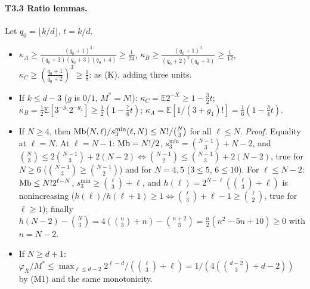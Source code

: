\documentclass[11pt]{article}
\newcommand{\E}{\mathbb{E}}
\theoremstyle{definition}
\theoremstyle{remark}
\begin{document}
\paragraph{T3.3 Ratio lemmas.} Let $q_0=\lfloor k/d\rfloor$, $t=k/d$.
\begin{itemize}
\item[(K3)] $\kappa_A\ge\frac{(q_0+1)^3}{(q_0+2)(q_0+3)(q_0+4)}\ge\frac1{24}$, $\kappa_B\ge\frac{(q_0+1)^3}{(q_0+2)^2(q_0+3)}\ge\frac1{12}$,
$\kappa_C\ge(\frac{q_0+1}{q_0+2})^3\ge\frac18$: as (K), adding three units.
\item[(K3-0)] If $k\le d-3$ ($g$ is $0/1$, $M^\ast=N!$): $\kappa_C=\E2^{-X}\ge1-\frac32t$; $\kappa_B=\frac12\E[3^{-g_1}2^{-g_2}]\ge\frac12(1-\frac76t)$;
$\kappa_A=\E[1/(3+g_1)!]=\frac16(1-\frac34t)$.
\item[(J3)] If $N\ge4$, then $\mathrm{Mb}(N,\ell)/s_3^{\min}(\ell,N)\le N!/\binom N3$ for all $\ell\le N$. \emph{Proof.} Equality at $\ell=N$. At $\ell=N-1$:
$\mathrm{Mb}=N!/2$, $s_3^{\min}=\binom{N-1}3+N-2$, and $\binom N3\le2\binom{N-1}3+2(N-2)\iff\binom{N-1}2\le\binom{N-1}3+2(N-2)$, true for $N\ge6$
($\binom{N-1}3\ge\binom{N-1}2$) and for $N=4,5$ ($3\le5$, $6\le10$). For $\ell\le N-2$: $\mathrm{Mb}\le N!2^{\ell-N}$, $s_3^{\min}\ge\binom\ell3+\ell$, and
$h(\ell)=2^{N-\ell}(\binom\ell3+\ell)$ is nonincreasing ($h(\ell)/h(\ell+1)\ge1\iff\binom\ell3+\ell-1\ge\binom\ell2$, true for $\ell\ge1$);
finally $h(N-2)-\binom N3=4(\binom n3+n)-\binom{n+2}3=\frac n2(n^2-5n+10)\ge0$ with $n=N-2$.
\item[(J3$'$)] If $N\ge d+1$: $\varphi_X/M^\ast\le\max_{\ell\le d-2}2^{\ell-d}/(\binom\ell3+\ell)=1/(4(\binom{d-2}3+d-2))$ by (M1) and the same monotonicity.
\end{itemize}
\end{document}
